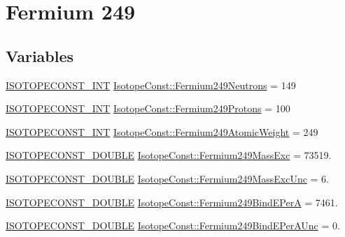 \hypertarget{group___isotope_const-_fermium-_fm249}{}\section{Fermium 249}
\label{group___isotope_const-_fermium-_fm249}
\subsection*{Variables}
\begin{DoxyCompactItemize}
\item 
\mbox{\hyperlink{group___isotope_const-_macros_ga5f18360b3e99483a35c32d789e62621c}{I\+S\+O\+T\+O\+P\+E\+C\+O\+N\+S\+T\+\_\+\+I\+NT}} \mbox{\hyperlink{group___isotope_const-_fermium-_fm249_ga431617cc2c24c4609c93167ed3bc8263}{Isotope\+Const\+::\+Fermium249\+Neutrons}} = 149
\item 
\mbox{\hyperlink{group___isotope_const-_macros_ga5f18360b3e99483a35c32d789e62621c}{I\+S\+O\+T\+O\+P\+E\+C\+O\+N\+S\+T\+\_\+\+I\+NT}} \mbox{\hyperlink{group___isotope_const-_fermium-_fm249_ga0fb2d54acfd570576f9e73f773a72ea2}{Isotope\+Const\+::\+Fermium249\+Protons}} = 100
\item 
\mbox{\hyperlink{group___isotope_const-_macros_ga5f18360b3e99483a35c32d789e62621c}{I\+S\+O\+T\+O\+P\+E\+C\+O\+N\+S\+T\+\_\+\+I\+NT}} \mbox{\hyperlink{group___isotope_const-_fermium-_fm249_gae81c6038e7879967b7221a6527bb5c49}{Isotope\+Const\+::\+Fermium249\+Atomic\+Weight}} = 249
\item 
\mbox{\hyperlink{group___isotope_const-_macros_ga8f45a7272ce02c0b4c65c44636ed719a}{I\+S\+O\+T\+O\+P\+E\+C\+O\+N\+S\+T\+\_\+\+D\+O\+U\+B\+LE}} \mbox{\hyperlink{group___isotope_const-_fermium-_fm249_ga77cd923831a9f1b08cddefe4f79f0b24}{Isotope\+Const\+::\+Fermium249\+Mass\+Exc}} = 73519.
\item 
\mbox{\hyperlink{group___isotope_const-_macros_ga8f45a7272ce02c0b4c65c44636ed719a}{I\+S\+O\+T\+O\+P\+E\+C\+O\+N\+S\+T\+\_\+\+D\+O\+U\+B\+LE}} \mbox{\hyperlink{group___isotope_const-_fermium-_fm249_ga0422193e316764517ca9b11c21daaca7}{Isotope\+Const\+::\+Fermium249\+Mass\+Exc\+Unc}} = 6.
\item 
\mbox{\hyperlink{group___isotope_const-_macros_ga8f45a7272ce02c0b4c65c44636ed719a}{I\+S\+O\+T\+O\+P\+E\+C\+O\+N\+S\+T\+\_\+\+D\+O\+U\+B\+LE}} \mbox{\hyperlink{group___isotope_const-_fermium-_fm249_ga205230c3aeae20beb3e31f056f701550}{Isotope\+Const\+::\+Fermium249\+Bind\+E\+PerA}} = 7461.
\item 
\mbox{\hyperlink{group___isotope_const-_macros_ga8f45a7272ce02c0b4c65c44636ed719a}{I\+S\+O\+T\+O\+P\+E\+C\+O\+N\+S\+T\+\_\+\+D\+O\+U\+B\+LE}} \mbox{\hyperlink{group___isotope_const-_fermium-_fm249_gad92ac8cb6a7e59b8cc06a54782f1954f}{Isotope\+Const\+::\+Fermium249\+Bind\+E\+Per\+A\+Unc}} = 0.

\end{DoxyCompactItemize}
